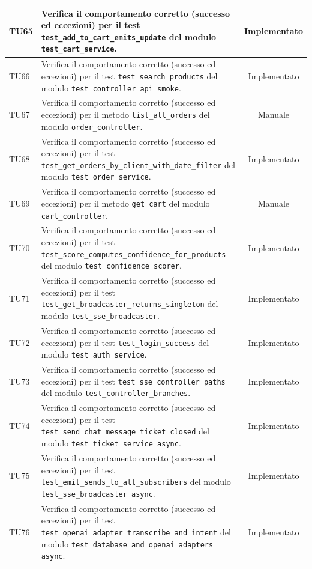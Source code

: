 \documentclass[a4paper,11pt,oneside]{scrartcl}
\begin{document}
\begin{longtable}{|p{1.9cm}|p{11.6cm}|c|}
    TU65 & Verifica il comportamento corretto (successo ed eccezioni) per il test \texttt{test\_add\_to\_cart\_emits\_update} del modulo \texttt{test\_cart\_service}. & Implementato \\ \hline
    TU66 & Verifica il comportamento corretto (successo ed eccezioni) per il test \texttt{test\_search\_products} del modulo \texttt{test\_controller\_api\_smoke}. & Implementato \\ \hline
    TU67 & Verifica il comportamento corretto (successo ed eccezioni) per il metodo \texttt{list\_all\_orders} del modulo \texttt{order\_controller}. & Manuale \\ \hline
    TU68 & Verifica il comportamento corretto (successo ed eccezioni) per il test \texttt{test\_get\_orders\_by\_client\_with\_date\_filter} del modulo \texttt{test\_order\_service}. & Implementato \\ \hline
    TU69 & Verifica il comportamento corretto (successo ed eccezioni) per il metodo \texttt{get\_cart} del modulo \texttt{cart\_controller}. & Manuale \\ \hline
    TU70 & Verifica il comportamento corretto (successo ed eccezioni) per il test \texttt{test\_score\_computes\_confidence\_for\_products} del modulo \texttt{test\_confidence\_scorer}. & Implementato \\ \hline
    TU71 & Verifica il comportamento corretto (successo ed eccezioni) per il test \texttt{test\_get\_broadcaster\_returns\_singleton} del modulo \texttt{test\_sse\_broadcaster}. & Implementato \\ \hline
    TU72 & Verifica il comportamento corretto (successo ed eccezioni) per il test \texttt{test\_login\_success} del modulo \texttt{test\_auth\_service}. & Implementato \\ \hline
    TU73 & Verifica il comportamento corretto (successo ed eccezioni) per il test \texttt{test\_sse\_controller\_paths} del modulo \texttt{test\_controller\_branches}. & Implementato \\ \hline
    TU74 & Verifica il comportamento corretto (successo ed eccezioni) per il test \texttt{test\_send\_chat\_message\_ticket\_closed} del modulo \texttt{test\_ticket\_service     async}. & Implementato \\ \hline
    TU75 & Verifica il comportamento corretto (successo ed eccezioni) per il test \texttt{test\_emit\_sends\_to\_all\_subscribers} del modulo \texttt{test\_sse\_broadcaster     async}. & Implementato \\ \hline
    TU76 & Verifica il comportamento corretto (successo ed eccezioni) per il test \texttt{test\_openai\_adapter\_transcribe\_and\_intent} del modulo \texttt{test\_database\_and\_openai\_adapters async}. & Implementato \\ \hline

\end{longtable}
\end{document}

